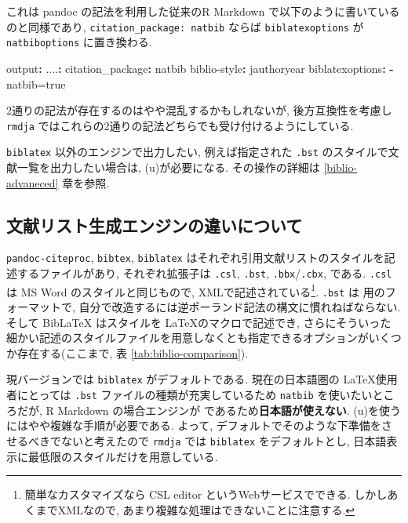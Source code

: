 \documentclass[
  xelatex,ja=standard,jafont=noto]{bxjsbook}
\newenvironment{Shaded}{\begin{snugshade}}{\end{snugshade}}
\newcommand{\AttributeTok}[1]{\textcolor[rgb]{0.77,0.63,0.00}{#1}}
\newcommand{\FunctionTok}[1]{\textcolor[rgb]{0.00,0.00,0.00}{#1}}
\newcommand{\KeywordTok}[1]{\textcolor[rgb]{0.13,0.29,0.53}{\textbf{#1}}}
\theoremstyle{definition}
\theoremstyle{definition}
\theoremstyle{definition}
\theoremstyle{definition}
\theoremstyle{remark}
\begin{document}
これは pandoc の記法を利用した従来のR Markdown
で以下のように書いているのと同様であり,
\texttt{citation\_package:\ natbib} ならば \texttt{biblatexoptions} が
\texttt{natbiboptions} に置き換わる.

\begin{Shaded}
\begin{Highlighting}[]
\FunctionTok{output}\KeywordTok{:}
\AttributeTok{  }\FunctionTok{....}\KeywordTok{:}
\AttributeTok{    }\FunctionTok{citation\_package}\KeywordTok{:}\AttributeTok{ natbib}
\FunctionTok{biblio{-}style}\KeywordTok{:}\AttributeTok{ jauthoryear}
\FunctionTok{biblatexoptions}\KeywordTok{:}
\AttributeTok{  }\KeywordTok{{-}}\AttributeTok{ natbib=true}
\end{Highlighting}
\end{Shaded}

2通りの記法が存在するのはやや混乱するかもしれないが, 後方互換性を考慮し
\texttt{rmdja}
ではこれらの2通りの記法どちらでも受け付けるようにしている.

\texttt{biblatex} 以外のエンジンで出力したい, 例えば指定された
\texttt{.bst} のスタイルで文献一覧を出力したい場合は,
(u)\pBibTeX が必要になる. その操作の詳細は \ref{biblio-advaneced}
章を参照.

\hypertarget{ux6587ux732eux30eaux30b9ux30c8ux751fux6210ux30a8ux30f3ux30b8ux30f3ux306eux9055ux3044ux306bux3064ux3044ux3066}{%
\subsection{文献リスト生成エンジンの違いについて}\label{ux6587ux732eux30eaux30b9ux30c8ux751fux6210ux30a8ux30f3ux30b8ux30f3ux306eux9055ux3044ux306bux3064ux3044ux3066}}

\texttt{pandoc-citeproc}, \texttt{bibtex}, \texttt{biblatex}
はそれぞれ引用文献リストのスタイルを記述するファイルがあり,
それぞれ拡張子は \texttt{.csl}, \texttt{.bst},
\texttt{.bbx}/\texttt{.cbx}, である. \texttt{.csl} は MS Word
のスタイルと同じもので, XMLで記述されている\footnote{簡単なカスタマイズなら
  CSL editor というWebサービスでできる. しかしあくまでXMLなので,
  あまり複雑な処理はできないことに注意する.}. \texttt{.bst} は
\BibTeX 用のフォーマットで,
自分で改造するには逆ポーランド記法の構文に慣れねばならない. そして
BibLaTeX はスタイルを \LaTeX のマクロで記述でき,
さらにそういった細かい記述のスタイルファイルを用意しなくとも指定できるオプションがいくつか存在する(ここまで,
表 \ref{tab:biblio-comparison}).

現バージョンでは \texttt{biblatex} がデフォルトである. 現在の日本語圏の
\LaTeX 使用者にとっては \texttt{.bst} ファイルの種類が充実しているため
\texttt{natbib} を使いたいところだが, R Markdown の場合エンジンが
\BibTeX であるため\textbf{日本語が使えない}.
(u)\pBibTeX を使うにはやや複雑な手順が必要である. よって,
デフォルトでそのような下準備をさせるべきでないと考えたので
\texttt{rmdja} では \texttt{biblatex} をデフォルトとし,
日本語表示に最低限のスタイルだけを用意している.
\end{document}
